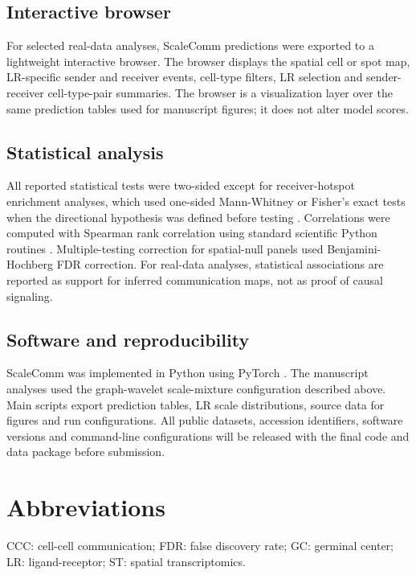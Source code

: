 \documentclass[referee,lineno,pdflatex,sn-vancouver-num]{sn-jnl}
\begin{document}
\subsection{Interactive browser}

For selected real-data analyses, ScaleComm predictions were exported to a lightweight interactive browser. The browser displays the spatial cell or spot map, LR-specific sender and receiver events, cell-type filters, LR selection and sender-receiver cell-type-pair summaries. The browser is a visualization layer over the same prediction tables used for manuscript figures; it does not alter model scores.

\subsection{Statistical analysis}

All reported statistical tests were two-sided except for receiver-hotspot enrichment analyses, which used one-sided Mann-Whitney or Fisher's exact tests when the directional hypothesis was defined before testing \citep{mannwhitney1947}. Correlations were computed with Spearman rank correlation using standard scientific Python routines \citep{scipy2020}. Multiple-testing correction for spatial-null panels used Benjamini-Hochberg FDR correction. For real-data analyses, statistical associations are reported as support for inferred communication maps, not as proof of causal signaling.

\subsection{Software and reproducibility}

ScaleComm was implemented in Python using PyTorch \citep{paszke2019pytorch}. The manuscript analyses used the graph-wavelet scale-mixture configuration described above. Main scripts export prediction tables, LR scale distributions, source data for figures and run configurations. All public datasets, accession identifiers, software versions and command-line configurations will be released with the final code and data package before submission.

\section*{Abbreviations}

CCC: cell-cell communication; FDR: false discovery rate; GC: germinal center; LR: ligand-receptor; ST: spatial transcriptomics.
\end{document}
